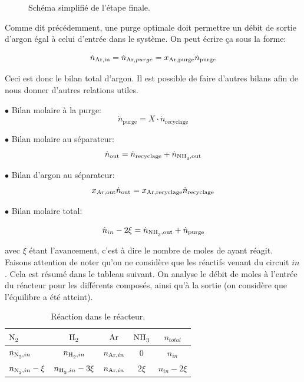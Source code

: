 \documentclass[a4paper, oneside, 12pt]{article}
\begin{document}
\begin{figure}[h!]
	\begin{center}
		
	\end{center}
	\caption{Schéma simplifié de l'étape finale.}
	\label{fig:flow_synthese}
\end{figure}

Comme dit précédemment, une purge optimale doit permettre un débit 
de sortie d'argon égal à celui d'entrée dans le système. 
On peut écrire ça sous la forme:

\begin{equation}
\dot{n}_{\ce{Ar},\text{in}}=\dot{n}_{\ce{Ar},purge}=x_{\ce{Ar},\text{purge}} \dot{n}_{\text{purge}}
\end{equation}

Ceci est donc le bilan total d'argon. 
Il est possible de faire d'autres bilans afin de nous donner d'autres relations utiles.

$\bullet$ Bilan molaire à la purge:
\begin{equation}
\dot{n}_{\text{purge}} = X \cdot \dot{n}_{\text{recyclage}}
\label{eq:bilan_mol_purge}
\end{equation}

$\bullet$ Bilan molaire au séparateur:
\begin{equation}
\dot{n}_{\text{out}}=\dot{n}_{\text{recyclage}}+\dot{n}_{\ce{NH3},\text{out}}
\label{eq:bilan_mol_sep}
\end{equation}

$\bullet$ Bilan d'argon au séparateur:
\begin{equation}
x_{Ar,\text{out}} \dot{n}_{\text{out}}=x_{\ce{Ar},\text{recyclage}} \dot{n}_{\text{recyclage}}
\end{equation}

$\bullet$ Bilan molaire total:

\begin{equation}
	\dot{n}_{in} - 2\xi=\dot{n}_{\ce{NH3},\text{out}} + \dot{n}_{\text{purge}}
	\label{eq:bilan_mol_tot}
\end{equation}

avec $\xi$ étant l'avancement, c'est à dire le nombre de moles de  ayant réagit. 
Faisons attention de noter qu'on ne considère que les réactifs venant du circuit $in$. 
Cela est résumé dans le tableau suivant. 
On analyse le débit de moles à l'entrée du réacteur pour les différents composés, 
ainsi qu'à la sortie (on considère que l'équilibre a été atteint).

\begin{table}[h!]
	\centering
	\begin{tabular}{l|c|c|c|c}
		$\ce{N2}$ & $\ce{H2}$ & $\ce{Ar}$ & $\ce{NH3}$ & $n_{total}$ \\
		\hline
		$n_{\ce{N2},in}$ & $n_{\ce{H2},in}$ & $n_{\ce{Ar},in}$ & $0$  & $n_{in}$\\
		$n_{\ce{N2},in}-\xi$ & $n_{\ce{H2},in}-3\xi$ & $n_{\ce{Ar},in}$ & $2\xi$  & $n_{in}-2\xi$\\
	\end{tabular}
	\caption{Réaction dans le réacteur.}
	\label{tab:reaction1_primaire}
\end{table}
\end{document}

